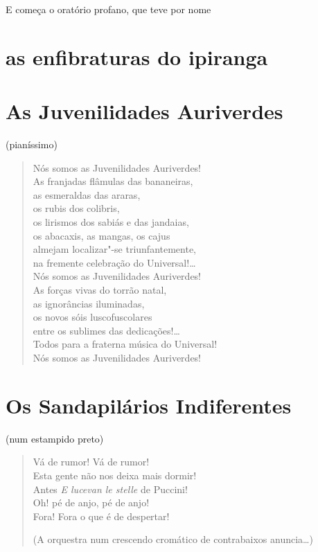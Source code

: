 E começa o oratório profano, que teve por nome

\section*{as enfibraturas do ipiranga}

\section*{As Juvenilidades Auriverdes}

\hfill{}(pianíssimo)

\begin{verse}
Nós somos as Juvenilidades Auriverdes!\\
As franjadas flâmulas das bananeiras,\\
as esmeraldas das araras,\\
os rubis dos colibris,\\
os lirismos dos sabiás e das jandaias,\\
os abacaxis, as mangas, os cajus\\
almejam localizar"-se triunfantemente,\\
na fremente celebração do Universal!\ldots{}\\
Nós somos as Juvenilidades Auriverdes!\\
As forças vivas do torrão natal,\\
as ignorâncias iluminadas,\\
os novos sóis luscofuscolares\\
entre os sublimes das dedicações!\ldots{}\\
Todos para a fraterna música do Universal!\\
Nós somos as Juvenilidades Auriverdes!
\end{verse}

\section*{Os Sandapilários Indiferentes}

\hfill{}(num estampido preto)

\begin{verse}
Vá de rumor! Vá de rumor!\\
Esta gente não nos deixa mais dormir!\\
Antes \emph{E lucevan le stelle} de Puccini!\\
Oh! pé de anjo, pé de anjo!\\
Fora! Fora o que é de despertar!

\hfill{}(A orquestra num crescendo cromático de contrabaixos anuncia\ldots{})
\end{verse}

